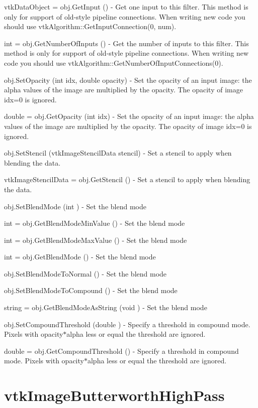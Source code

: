 \begin{DoxyItemize}
\item {\ttfamily vtk\-Data\-Object = obj.\-Get\-Input ()} -\/ Get one input to this filter. This method is only for support of old-\/style pipeline connections. When writing new code you should use vtk\-Algorithm\-::\-Get\-Input\-Connection(0, num).  
\item {\ttfamily int = obj.\-Get\-Number\-Of\-Inputs ()} -\/ Get the number of inputs to this filter. This method is only for support of old-\/style pipeline connections. When writing new code you should use vtk\-Algorithm\-::\-Get\-Number\-Of\-Input\-Connections(0).  
\item {\ttfamily obj.\-Set\-Opacity (int idx, double opacity)} -\/ Set the opacity of an input image\-: the alpha values of the image are multiplied by the opacity. The opacity of image idx=0 is ignored.  
\item {\ttfamily double = obj.\-Get\-Opacity (int idx)} -\/ Set the opacity of an input image\-: the alpha values of the image are multiplied by the opacity. The opacity of image idx=0 is ignored.  
\item {\ttfamily obj.\-Set\-Stencil (vtk\-Image\-Stencil\-Data stencil)} -\/ Set a stencil to apply when blending the data.  
\item {\ttfamily vtk\-Image\-Stencil\-Data = obj.\-Get\-Stencil ()} -\/ Set a stencil to apply when blending the data.  
\item {\ttfamily obj.\-Set\-Blend\-Mode (int )} -\/ Set the blend mode  
\item {\ttfamily int = obj.\-Get\-Blend\-Mode\-Min\-Value ()} -\/ Set the blend mode  
\item {\ttfamily int = obj.\-Get\-Blend\-Mode\-Max\-Value ()} -\/ Set the blend mode  
\item {\ttfamily int = obj.\-Get\-Blend\-Mode ()} -\/ Set the blend mode  
\item {\ttfamily obj.\-Set\-Blend\-Mode\-To\-Normal ()} -\/ Set the blend mode  
\item {\ttfamily obj.\-Set\-Blend\-Mode\-To\-Compound ()} -\/ Set the blend mode  
\item {\ttfamily string = obj.\-Get\-Blend\-Mode\-As\-String (void )} -\/ Set the blend mode  
\item {\ttfamily obj.\-Set\-Compound\-Threshold (double )} -\/ Specify a threshold in compound mode. Pixels with opacity$\ast$alpha less or equal the threshold are ignored.  
\item {\ttfamily double = obj.\-Get\-Compound\-Threshold ()} -\/ Specify a threshold in compound mode. Pixels with opacity$\ast$alpha less or equal the threshold are ignored.  
\end{DoxyItemize}\hypertarget{vtkimaging_vtkimagebutterworthhighpass}{}\section{vtk\-Image\-Butterworth\-High\-Pass}\label{vtkimaging_vtkimagebutterworthhighpass}
